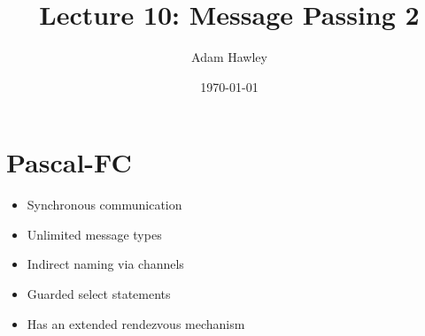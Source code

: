 \documentclass[11pt]{article}
\author{Adam Hawley}
\date{\today}
\title{Lecture 10: Message Passing 2}
\begin{document}
\maketitle
\tableofcontents


\section{Pascal-FC}
\label{sec:orgc2b5001}
\begin{itemize}
\item Synchronous communication
\item Unlimited message types
\item Indirect naming via channels
\item Guarded select statements
\item Has an extended rendezvous mechanism
\end{itemize}
\end{document}
